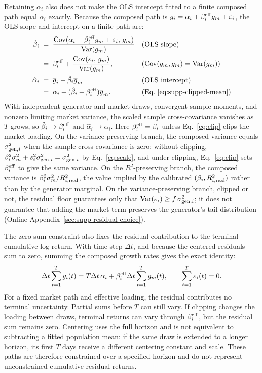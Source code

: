 Retaining $\alpha_i$ also does not make the OLS intercept fitted to a
finite composed path equal $\alpha_i$ exactly. Because the composed
path is $g_i = \alpha_i + \beta_i^{\mathrm{eff}} g_m + \varepsilon_i$, the OLS slope
and intercept on a finite path are:
\begin{align}
  \hat\beta_i
    &\;=\; \frac{\operatorname{Cov}(\alpha_i + \beta_i^{\mathrm{eff}} g_m + \varepsilon_i,\, g_m)}{\operatorname{Var}(g_m)}
    && \text{(OLS slope)} \notag \\
    &\;=\; \beta_i^{\mathrm{eff}} + \frac{\operatorname{Cov}(\varepsilon_i,\, g_m)}{\operatorname{Var}(g_m)},
    && \text{($\operatorname{Cov}(g_m, g_m) = \operatorname{Var}(g_m)$)} \notag \\
  \hat\alpha_i
    &\;=\; \overline{g}_i-\hat\beta_i\overline{g}_m
    && \text{(OLS intercept)} \notag \\
    &\;=\; \alpha_i-(\hat\beta_i-\beta_i^{\mathrm{eff}})\overline{g}_m.
    && \text{(Eq.~\eqref{eq:supp-clipped-mean})}
\end{align}
With independent generator and market draws, convergent sample
moments, and nonzero limiting market variance, the scaled sample
cross-covariance vanishes as $T$ grows, so $\hat\beta_i \to \beta_i^{\mathrm{eff}}$ and
$\hat\alpha_i \to \alpha_i$. Here $\beta_i^{\mathrm{eff}}=\beta_i$ unless
Eq.~\eqref{eq:clip} clips the market loading. On the
variance-preserving branch, the composed variance equals
$\sigma_{\mathrm{gen},i}^2$ when the sample cross-covariance is zero: without
clipping, $\beta_i^2 \sigma_m^2 + s_i^2 \sigma_{\mathrm{gen},i}^2 =
\sigma_{\mathrm{gen},i}^2$ by Eq.~\eqref{eq:scale}, and under clipping,
Eq.~\eqref{eq:clip} sets $\beta_i^{\mathrm{eff}}$ to give the same variance.
On the $R^2$-preserving branch, the composed variance is
$\beta_i^2 \sigma_m^2 / R^2_{i,\mathrm{real}}$, the value implied by the
calibrated $(\beta_i, R^2_{i,\mathrm{real}})$ rather than by the generator
marginal. On the variance-preserving branch, clipped or not, the
residual floor guarantees only that $\operatorname{Var}(\varepsilon_i)\geq
f\,\sigma_{\mathrm{gen},i}^2$; it does not guarantee that adding the market
term preserves the generator's tail distribution (Online
Appendix~\ref{sec:supp-residual-choice}).

The zero-sum constraint also fixes the residual contribution to the
terminal cumulative log return. With time step $\Delta t$, and because
the centered residuals sum to zero, summing the composed growth rates
gives the exact identity:
\begin{equation}
  \Delta t\sum_{t=1}^{T} g_i(t)
  = T\Delta t\,\alpha_i
    + \beta_i^{\mathrm{eff}}\Delta t\sum_{t=1}^{T}g_m(t),
  \qquad \sum_{t=1}^{T}\varepsilon_i(t)=0.
  \label{eq:supp-zero-sum-terminal}
\end{equation}
For a fixed market path and effective loading, the residual contributes
no terminal uncertainty. Partial sums before $T$ can still vary. If
clipping changes the loading between draws, terminal returns can vary
through $\beta_i^{\mathrm{eff}}$, but the residual sum remains zero. Centering
uses the full horizon and is not equivalent to subtracting a fitted
population mean: if the same draw is extended to a longer horizon, its
first $T$ days receive a different centering constant and scale. These
paths are therefore constrained over a specified horizon and do not
represent unconstrained cumulative residual returns.

